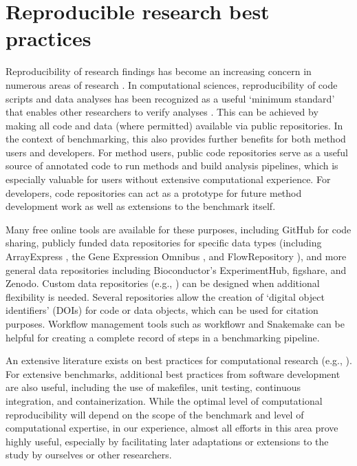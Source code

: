 \documentclass[12pt, a4paper]{article}
\begin{document}
\section*{Reproducible research best practices}

Reproducibility of research findings has become an increasing concern in numerous areas of research \citep{Ioannidis2005}. In computational sciences, reproducibility of code scripts and data analyses has been recognized as a useful `minimum standard' that enables other researchers to verify analyses \citep{Peng2011}. This can be achieved by making all code and data (where permitted) available via public repositories. In the context of benchmarking, this also provides further benefits for both method users and developers. For method users, public code repositories serve as a useful source of annotated code to run methods and build analysis pipelines, which is especially valuable for users without extensive computational experience. For developers, code repositories can act as a prototype for future method development work as well as extensions to the benchmark itself.

Many free online tools are available for these purposes, including GitHub for code sharing, publicly funded data repositories for specific data types (including ArrayExpress \citep{Kolesnikov2015}, the Gene Expression Omnibus \citep{Barrett2013}, and FlowRepository \citep{Spidlen2012}), and more general data repositories including Bioconductor's ExperimentHub, figshare, and Zenodo. Custom data repositories (e.g., \citep{Soneson2018}) can be designed when additional flexibility is needed. Several repositories allow the creation of `digital object identifiers' (DOIs) for code or data objects, which can be used for citation purposes. Workflow management tools such as workflowr \cite{Blischak2018} and Snakemake \citep{Koster2012} can be helpful for creating a complete record of steps in a benchmarking pipeline.

An extensive literature exists on best practices for computational research (e.g., \citep{Sandve2013}). For extensive benchmarks, additional best practices from software development are also useful, including the use of makefiles, unit testing, continuous integration, and containerization. While the optimal level of computational reproducibility will depend on the scope of the benchmark and level of computational expertise, in our experience, almost all efforts in this area prove highly useful, especially by facilitating later adaptations or extensions to the study by ourselves or other researchers.
\end{document}

